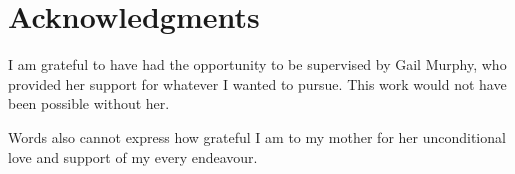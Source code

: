 
\chapter{Acknowledgments}

I am grateful to have had the opportunity to be supervised by Gail Murphy,
who provided her support for whatever I wanted to pursue.
This work would not have been possible without her.


Words also cannot express how grateful I am to my mother for her
unconditional love and support of my every endeavour.